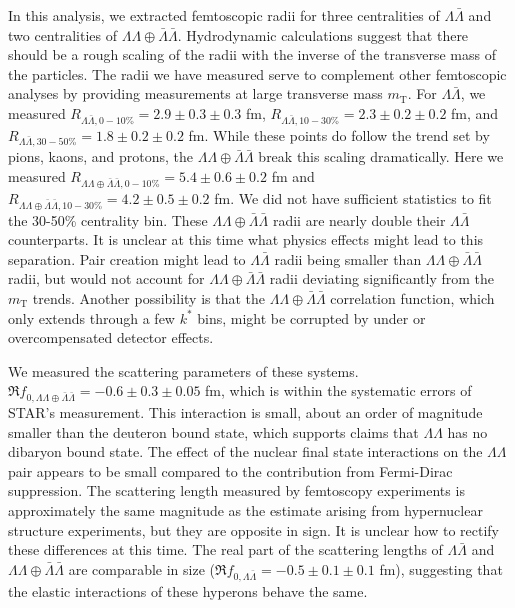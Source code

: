 In this analysis, we extracted femtoscopic radii for three centralities of $\Lambda\bar{\Lambda}$ and two centralities of $\Lambda\Lambda\oplus\bar{\Lambda}\bar{\Lambda}$.
Hydrodynamic calculations suggest that there should be a rough scaling of the radii with the inverse of the transverse mass of the particles.
The radii we have measured serve to complement other femtoscopic analyses by providing measurements at large transverse mass $m_\mathrm{T}$.
For $\Lambda\bar{\Lambda}$, we measured $R_{\Lambda\bar{\Lambda},0-10\%} = 2.9\pm 0.3 \pm 0.3$ fm, $R_{\Lambda\bar{\Lambda},10-30\%} = 2.3\pm 0.2 \pm 0.2$ fm, and $R_{\Lambda\bar{\Lambda},30-50\%} = 1.8\pm 0.2 \pm 0.2$ fm. 
While these points do follow the trend set by pions, kaons, and protons, the $\Lambda\Lambda\oplus\bar{\Lambda}\bar{\Lambda}$ break this scaling dramatically.
Here we measured $R_{\Lambda\Lambda\oplus\bar{\Lambda}\bar{\Lambda}, 0-10\%} = 5.4 \pm 0.6 \pm 0.2$ fm and  $R_{\Lambda\Lambda\oplus\bar{\Lambda}\bar{\Lambda}, 10-30\%} = 4.2 \pm 0.5 \pm 0.2$ fm.
We did not have sufficient statistics to fit the 30-50\% centrality bin.
These $\Lambda\Lambda\oplus\bar{\Lambda}\bar{\Lambda}$ radii are nearly double their $\Lambda\bar{\Lambda}$ counterparts.
It is unclear at this time what physics effects might lead to this separation.
Pair creation might lead to $\Lambda\bar{\Lambda}$ radii being smaller than $\Lambda\Lambda\oplus\bar{\Lambda}\bar{\Lambda}$ radii, but would not account for $\Lambda\Lambda\oplus\bar{\Lambda}\bar{\Lambda}$ radii deviating significantly from the $m_\mathrm{T}$ trends.
Another possibility is that the $\Lambda\Lambda\oplus\bar{\Lambda}\bar{\Lambda}$ correlation function, which only extends through a few $k^*$ bins, might be corrupted by under or overcompensated detector effects.

We measured the scattering parameters of these systems.
$\Re f_{0,\Lambda\Lambda\oplus\bar{\Lambda}\bar{\Lambda}} = -0.6 \pm 0.3 \pm 0.05$ fm, which is within the systematic errors of STAR's measurement.
This interaction is small, about an order of magnitude smaller than the deuteron bound state, which supports claims that $\Lambda\Lambda$ has no dibaryon bound state.
The effect of the nuclear final state interactions on the $\Lambda\Lambda$ pair appears to be small compared to the contribution from Fermi-Dirac suppression.
The scattering length measured by femtoscopy experiments is approximately the same magnitude as the estimate arising from hypernuclear structure experiments, but they are opposite in sign.
It is unclear how to rectify these differences at this time.
The real part of the scattering lengths of $\Lambda\bar{\Lambda}$ and $\Lambda\Lambda\oplus\bar{\Lambda}\bar{\Lambda}$ are comparable in size ($\Re f_{0,\Lambda\bar{\Lambda}} = -0.5 \pm 0.1 \pm 0.1$ fm), suggesting that the elastic interactions of these hyperons behave the same.

